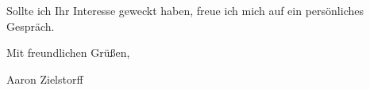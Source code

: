 \documentclass[
	12pt, %
]{letter}
\begin{document}
Sollte ich Ihr Interesse geweckt haben, freue ich mich auf ein persönliches Gespräch.

\smallskip %

Mit freundlichen Grüßen,

\bigskip\bigskip\bigskip %

Aaron Zielstorff

\end{document}
